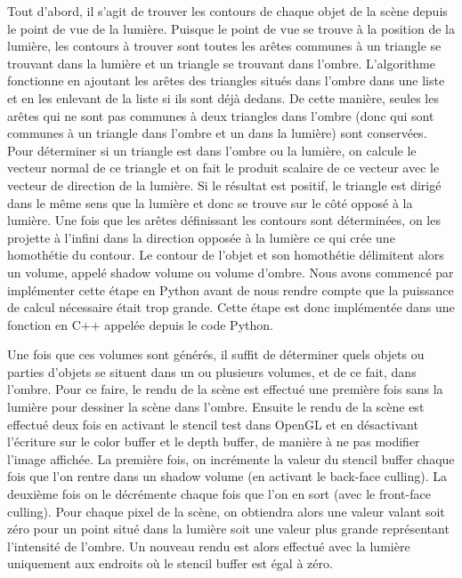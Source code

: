 \documentclass[a4paper,12pt]{report}
\begin{document}
Tout d'abord, il s'agit de trouver les contours de chaque objet de la scène depuis le point de vue de la lumière. 
Puisque le point de vue se trouve à la position de la lumière, les contours à trouver sont toutes les arêtes communes à un triangle se trouvant dans la lumière et un triangle se trouvant dans l'ombre. 
L'algorithme fonctionne en ajoutant les ar\^etes des triangles situés dans l'ombre dans une liste et en les enlevant de la liste si ils sont déjà dedans.
De cette manière, seules les arêtes qui ne sont pas communes à deux triangles dans l'ombre (donc qui sont communes à un triangle dans l'ombre et un dans la lumière) sont conservées.
Pour déterminer si un triangle est dans l'ombre ou la lumière, on calcule le vecteur normal de ce triangle et on fait le produit scalaire de ce vecteur avec le vecteur de direction de la lumière. Si le résultat est positif, le triangle est dirigé dans le même sens que la lumière et donc se trouve sur le c\^oté opposé à la lumière.
Une fois que les ar\^etes définissant les contours sont déterminées, on les projette à l'infini dans la direction opposée à la lumière ce qui crée une homothétie du contour. Le contour de l'objet et son homothétie délimitent alors un volume, appelé shadow volume ou volume d'ombre. 
Nous avons commencé par implémenter cette étape en Python avant de nous rendre compte que la puissance de calcul nécessaire était trop grande.
Cette étape est donc implémentée dans une fonction en C++ appelée depuis le code Python.

Une fois que ces volumes sont générés, il suffit de déterminer quels objets ou parties d'objets se situent dans un ou plusieurs volumes, et de ce fait, dans l'ombre. 
Pour ce faire, le rendu de la scène est effectué une première fois sans la lumière pour dessiner la scène dans l'ombre.
Ensuite le rendu de la scène est effectué deux fois en activant le stencil test dans OpenGL et en désactivant l'écriture sur le color buffer et le depth buffer, de manière à ne pas modifier l'image affichée. La première fois, on incrémente la valeur du stencil buffer chaque fois que l'on rentre dans un shadow volume (en activant le back-face culling). La deuxième fois on le décrémente chaque fois que l'on en sort (avec le front-face culling). Pour chaque pixel de la scène, on obtiendra alors une valeur valant soit zéro pour un point situé dans la lumière soit une valeur plus grande représentant l'intensité de l'ombre.
Un nouveau rendu est alors effectué avec la lumière uniquement aux endroits où le stencil buffer est égal à zéro.
\end{document}
